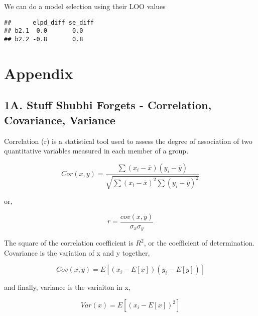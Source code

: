 \documentclass[12pt,]{article}
\newenvironment{Shaded}{\begin{snugshade}}{\end{snugshade}}
\newcommand{\KeywordTok}[1]{\textcolor[rgb]{0.13,0.29,0.53}{\textbf{#1}}}
\newcommand{\DataTypeTok}[1]{\textcolor[rgb]{0.13,0.29,0.53}{#1}}
\newcommand{\DecValTok}[1]{\textcolor[rgb]{0.00,0.00,0.81}{#1}}
\newcommand{\StringTok}[1]{\textcolor[rgb]{0.31,0.60,0.02}{#1}}
\newcommand{\OperatorTok}[1]{\textcolor[rgb]{0.81,0.36,0.00}{\textbf{#1}}}
\newcommand{\NormalTok}[1]{#1}
\begin{document}
{We can do a model selection using their LOO values

\begin{Shaded}
\end{Shaded}

\begin{verbatim}
##      elpd_diff se_diff
## b2.1  0.0       0.0   
## b2.2 -0.8       0.8
\end{verbatim}

\section{Appendix}\label{appendix}

\subsection{1A. Stuff Shubhi Forgets - Correlation, Covariance,
Variance}\label{a.-stuff-shubhi-forgets---correlation-covariance-variance}

Correlation (r) is a statistical tool used to assess the degree of
association of two quantitative variables measured in each member of a
group.

\[
Cor(x, y) = \frac{\sum (x_i - \bar{x})(y_i - \bar{y})}{\sqrt{\sum(x_i - \bar{x})^2 \sum(y_i - \bar{y})^2}}
\]

or,

\[
r = \frac{cov(x,y)}{\sigma_x \sigma_y}
\]

The square of the correlation coefficient is \(R^2\), or the coefficient
of determination. Covariance is the variation of x and y together,

\[Cov(x, y) = E[(x_i - E[x])(y_i- E[y])]\]

and finally, variance is the variaiton in x,

\[Var(x) = E[(x_i - E[x])^2]\]
\end{document}
